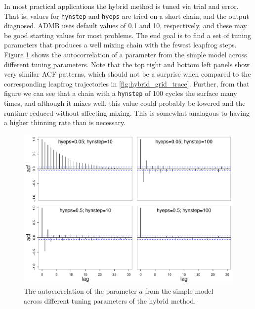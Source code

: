 \documentclass{article}\usepackage[]{graphicx}\usepackage[]{color}
\begin{document}
In most practical applications the hybrid method is tuned
via trial and error. That is, values for \texttt{hynstep}
and \texttt{hyeps} are tried on a short chain, and the
output diagnosed. ADMB uses default values of 0.1 and 10,
respectively, and these may be good starting values for most
problems. The end goal is to find a set of tuning parameters
that produces a well mixing chain with the fewest leapfrog
steps. Figure \ref{fig:hybrid_grid_acf} shows the
autocorrelation of a parameter from the simple model across
different tuning parameters. Note that the top right and
bottom left panels show very similar ACF patterns, which
should not be a surprise when compared to the corresponding
leapfrog trajectories in
\ref{fig:hybrid_grid_trace}. Further, from that figure we
can see that a chain with a \texttt{hynstep} of 100 cycles
the surface many times, and although it mixes well, this
value could probably be lowered and the runtime reduced
without affecting mixing. This is somewhat analagous to
having a higher thinning rate than is necessary.

\begin{figure}[h]
  \centering
  \includegraphics[width=5in]{../plots/hybrid_grid_acf.pdf}
  \caption{The autocorrelation of the parameter $a$ from the simple model
    across different tuning parameters of the hybrid method.}
  \label{fig:hybrid_grid_acf}
\end{figure}
\end{document}

